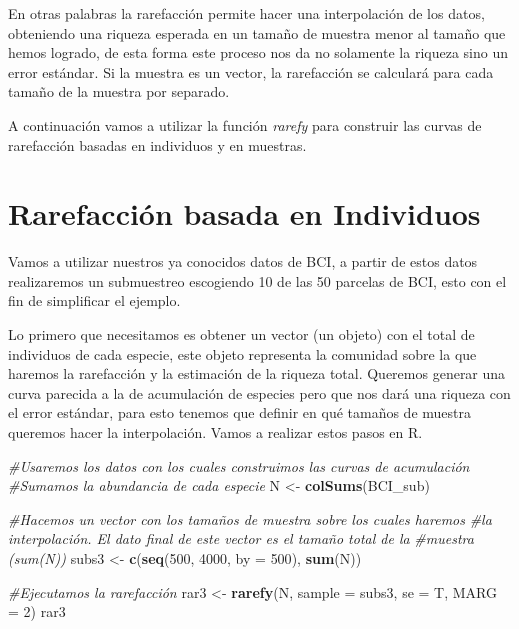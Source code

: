 \documentclass[]{book}
\newenvironment{Shaded}{\begin{snugshade}}{\end{snugshade}}
\newcommand{\KeywordTok}[1]{\textcolor[rgb]{0.13,0.29,0.53}{\textbf{{#1}}}}
\newcommand{\DataTypeTok}[1]{\textcolor[rgb]{0.13,0.29,0.53}{{#1}}}
\newcommand{\DecValTok}[1]{\textcolor[rgb]{0.00,0.00,0.81}{{#1}}}
\newcommand{\StringTok}[1]{\textcolor[rgb]{0.31,0.60,0.02}{{#1}}}
\newcommand{\CommentTok}[1]{\textcolor[rgb]{0.56,0.35,0.01}{\textit{{#1}}}}
\newcommand{\NormalTok}[1]{{#1}}
\begin{document}
En otras palabras la rarefacción permite hacer una interpolación de los
datos, obteniendo una riqueza esperada en un tamaño de muestra menor al
tamaño que hemos logrado, de esta forma este proceso nos da no solamente
la riqueza sino un error estándar. Si la muestra es un vector, la
rarefacción se calculará para cada tamaño de la muestra por separado.

A continuación vamos a utilizar la función \emph{rarefy} para construir
las curvas de rarefacción basadas en individuos y en muestras.

\section{Rarefacción basada en
Individuos}\label{rarefaccion-basada-en-individuos}

Vamos a utilizar nuestros ya conocidos datos de BCI, a partir de estos
datos realizaremos un submuestreo escogiendo 10 de las 50 parcelas de
BCI, esto con el fin de simplificar el ejemplo.

Lo primero que necesitamos es obtener un vector (un objeto) con el total
de individuos de cada especie, este objeto representa la comunidad sobre
la que haremos la rarefacción y la estimación de la riqueza total.
Queremos generar una curva parecida a la de acumulación de especies pero
que nos dará una riqueza con el error estándar, para esto tenemos que
definir en qué tamaños de muestra queremos hacer la interpolación. Vamos
a realizar estos pasos en R.

\begin{Shaded}
\begin{Highlighting}[]
\CommentTok{#Usaremos los datos con los cuales construimos las curvas de acumulación}
\CommentTok{#Sumamos la abundancia de cada especie}
\NormalTok{N <-}\StringTok{ }\KeywordTok{colSums}\NormalTok{(BCI_sub) }

\CommentTok{#Hacemos un vector con los tamaños de muestra sobre los cuales haremos }
\CommentTok{#la interpolación. El dato final de este vector es el tamaño total de la }
\CommentTok{#muestra (sum(N))}
\NormalTok{subs3 <-}\StringTok{ }\KeywordTok{c}\NormalTok{(}\KeywordTok{seq}\NormalTok{(}\DecValTok{500}\NormalTok{, }\DecValTok{4000}\NormalTok{, }\DataTypeTok{by =} \DecValTok{500}\NormalTok{), }\KeywordTok{sum}\NormalTok{(N)) }

\CommentTok{#Ejecutamos la rarefacción}
\NormalTok{rar3 <-}\StringTok{ }\KeywordTok{rarefy}\NormalTok{(N, }\DataTypeTok{sample =} \NormalTok{subs3, }\DataTypeTok{se =} \NormalTok{T, }\DataTypeTok{MARG =} \DecValTok{2}\NormalTok{)}
\NormalTok{rar3}
\end{Highlighting}
\end{Shaded}
\end{document}
